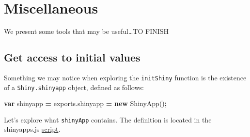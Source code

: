 \documentclass[
]{book}
\newenvironment{Shaded}{\begin{snugshade}}{\end{snugshade}}
\newcommand{\AttributeTok}[1]{\textcolor[rgb]{0.77,0.63,0.00}{#1}}
\newcommand{\KeywordTok}[1]{\textcolor[rgb]{0.13,0.29,0.53}{\textbf{#1}}}
\newcommand{\NormalTok}[1]{#1}
\newcommand{\OperatorTok}[1]{\textcolor[rgb]{0.81,0.36,0.00}{\textbf{#1}}}
\newcommand{\VariableTok}[1]{\textcolor[rgb]{0.00,0.00,0.00}{#1}}
\begin{document}
\hypertarget{miscellaneous}{%
\section{Miscellaneous}\label{miscellaneous}}

We present some tools that may be useful\ldots TO FINISH

\hypertarget{get-access-to-initial-values}{%
\subsection{Get access to initial values}\label{get-access-to-initial-values}}

Something we may notice when exploring the \texttt{initShiny} function is the existence of a \texttt{Shiny.shinyapp} object, defined as follows:

\begin{Shaded}
\begin{Highlighting}[]
\KeywordTok{var}\NormalTok{ shinyapp }\OperatorTok{=} \VariableTok{exports}\NormalTok{.}\AttributeTok{shinyapp} \OperatorTok{=} \KeywordTok{new} \AttributeTok{ShinyApp}\NormalTok{()}\OperatorTok{;}
\end{Highlighting}
\end{Shaded}

Let's explore what \texttt{shinyApp} contains. The definition is located in the shinyapps.js \href{https://github.com/rstudio/shiny/blob/master/srcjs/shinyapp.js}{script}.
\end{document}
